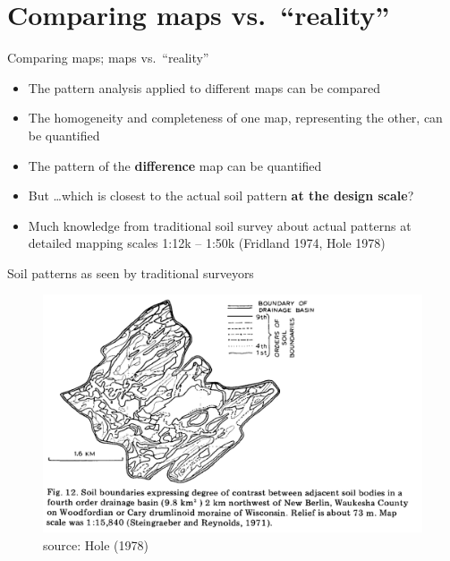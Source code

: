 \documentclass[aspectratio=169, 10pt]{beamer}
\begin{document}
  

\section{Comparing maps vs.\ ``reality''}

\begin{frame}{Comparing maps; maps vs.\ ``reality''}
    \begin{itemize}
        \item The pattern analysis applied to different maps can be compared
        \item The homogeneity and completeness of one map, representing the other, can be quantified
        \item The pattern of the \textbf{difference} map can be quantified
        \item But \ldots which is closest to the actual soil pattern \textbf{at the design scale}?
        \item Much knowledge from traditional soil survey about actual patterns at detailed mapping scales 1:12k -- 1:50k (Fridland 1974, Hole 1978)
    \end{itemize}
\end{frame}


\begin{frame}{Soil patterns as seen by traditional surveyors}
    \begin{figure}
        \centering
        \includegraphics[height=0.75\textheight]{graphics_david/10.1016.0016-7061(78)90002-2_Fig12.png}
\\source: Hole (1978)
    \end{figure}
\end{frame}
\end{document}
